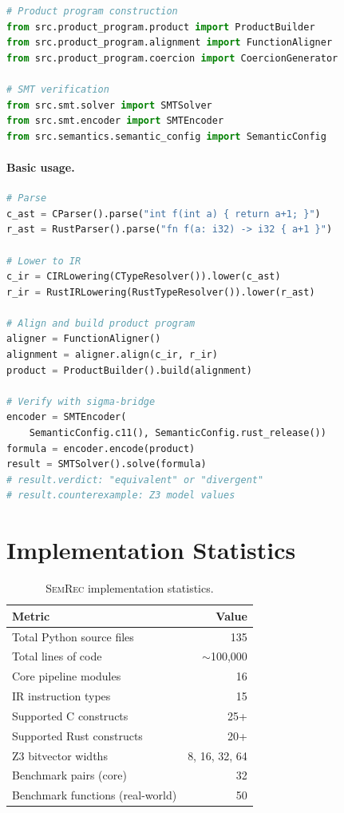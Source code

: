 \documentclass[11pt,a4paper]{article}
\begin{document}
\begin{appendices}
\begin{lstlisting}[language=Python,escapechar=|]
# Product program construction
from src.product_program.product import ProductBuilder
from src.product_program.alignment import FunctionAligner
from src.product_program.coercion import CoercionGenerator

# SMT verification
from src.smt.solver import SMTSolver
from src.smt.encoder import SMTEncoder
from src.semantics.semantic_config import SemanticConfig
\end{lstlisting}

\paragraph{Basic usage.}
\begin{lstlisting}[language=Python,escapechar=|]
# Parse
c_ast = CParser().parse("int f(int a) { return a+1; }")
r_ast = RustParser().parse("fn f(a: i32) -> i32 { a+1 }")

# Lower to IR
c_ir = CIRLowering(CTypeResolver()).lower(c_ast)
r_ir = RustIRLowering(RustTypeResolver()).lower(r_ast)

# Align and build product program
aligner = FunctionAligner()
alignment = aligner.align(c_ir, r_ir)
product = ProductBuilder().build(alignment)

# Verify with sigma-bridge
encoder = SMTEncoder(
    SemanticConfig.c11(), SemanticConfig.rust_release())
formula = encoder.encode(product)
result = SMTSolver().solve(formula)
# result.verdict: "equivalent" or "divergent"
# result.counterexample: Z3 model values
\end{lstlisting}


\section{Implementation Statistics}\label{app:impl-stats}

\begin{table}[h]
\centering
\small
\caption{\textsc{SemRec} implementation statistics.}
\label{tab:impl-stats}
\begin{tabular}{@{}lr@{}}
\toprule
Metric & Value \\
\midrule
Total Python source files & 135 \\
Total lines of code & $\sim$100,000 \\
Core pipeline modules & 16 \\
IR instruction types & 15 \\
Supported C constructs & 25+ \\
Supported Rust constructs & 20+ \\
Z3 bitvector widths & 8, 16, 32, 64 \\
Benchmark pairs (core) & 32 \\
Benchmark functions (real-world) & 50 \\
\bottomrule
\end{tabular}
\end{table}



\end{appendices}
\end{document}
